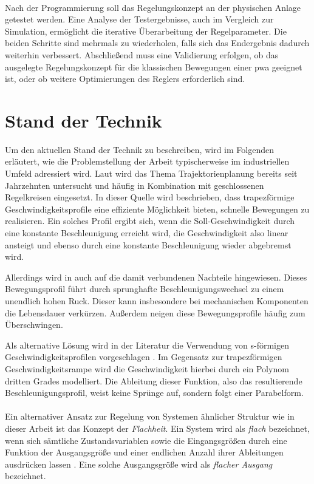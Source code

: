 \\
Nach der Programmierung soll das Regelungskonzept an der physischen Anlage getestet werden. Eine Analyse der Testergebnisse, auch im Vergleich zur Simulation, ermöglicht die iterative Überarbeitung der Regelparameter. Die beiden Schritte sind mehrmals zu wiederholen, falls sich das Endergebnis dadurch weiterhin verbessert. Abschließend muss eine Validierung erfolgen, ob das ausgelegte Regelungskonzept für die klassischen Bewegungen einer \ac{pwa} geeignet ist, oder ob weitere Optimierungen des Reglers erforderlich sind.

\section{Stand der Technik}
\label{sec:stand_der_technik}
Um den aktuellen Stand der Technik zu beschreiben, wird im Folgenden erläutert, wie die Problemstellung der Arbeit typischerweise im industriellen Umfeld adressiert wird. Laut \cite{traj_s} wird das Thema Trajektorienplanung bereits seit Jahrzehnten untersucht und häufig in Kombination mit geschlossenen Regelkreisen eingesetzt. In dieser Quelle wird beschrieben, dass trapezförmige Geschwindigkeitsprofile eine effiziente Möglichkeit bieten, schnelle Bewegungen zu realisieren. Ein solches Profil ergibt sich, wenn die Soll-Geschwindigkeit durch eine konstante Beschleunigung erreicht wird, die Geschwindigkeit also linear ansteigt und ebenso durch eine konstante Beschleunigung wieder abgebremst wird.

Allerdings wird in \cite{traj_s} auch auf die damit verbundenen Nachteile hingewiesen. Dieses Bewegungsprofil führt durch sprunghafte Beschleunigungswechsel zu einem unendlich hohen Ruck. Dieser kann insbesondere bei mechanischen Komponenten die Lebensdauer verkürzen. Außerdem neigen diese Bewegungsprofile häufig zum Überschwingen.

Als alternative Lösung wird in der Literatur die Verwendung von s-förmigen Geschwindigkeitsprofilen vorgeschlagen \cite{traj_s}. Im Gegensatz zur trapezförmigen Geschwindigkeitsrampe wird die Geschwindigkeit hierbei durch ein Polynom dritten Grades modelliert. Die Ableitung dieser Funktion, also das resultierende Beschleunigungsprofil, weist keine Sprünge auf, sondern folgt einer Parabelform.\\
\\
Ein alternativer Ansatz zur Regelung von Systemen ähnlicher Struktur wie in dieser Arbeit ist das Konzept der \textit{Flachheit}. Ein System wird als \textit{flach} bezeichnet, wenn sich sämtliche Zustandsvariablen sowie die Eingangsgrößen durch eine Funktion der Ausgangsgröße und einer endlichen Anzahl ihrer Ableitungen ausdrücken lassen \cite{flachheit}. Eine solche Ausgangsgröße wird als \textit{flacher Ausgang} bezeichnet.

